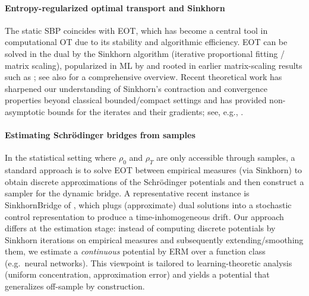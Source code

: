\documentclass[11pt]{article}
\theoremstyle{remark}
\numberwithin{equation}{section}
\begin{document}
\paragraph{Entropy-regularized optimal transport and Sinkhorn}
The static SBP coincides with EOT, which has become a
central tool in computational OT due to its stability and algorithmic efficiency.
EOT can be solved in the dual by the Sinkhorn algorithm (iterative proportional fitting / matrix scaling),
popularized in ML by \citet{Cuturi2013} and rooted in earlier matrix-scaling results such as
\citet{FranklinLorenz1989}; see also \citet{PeyreCuturi2019} for a comprehensive overview.
Recent theoretical work has sharpened our understanding of Sinkhorn’s contraction and convergence
properties beyond classical bounded/compact settings and has provided non-asymptotic bounds for
the iterates and their gradients; see, e.g., \citet{ConfortiDurmusGreco2023,GrecoNobleConfortiDurmus2023}.

\paragraph{Estimating Schr\"odinger bridges from samples}
In the statistical setting where $\rho_0$ and $\rho_T$ are only accessible through samples, a standard
approach is to solve EOT between empirical measures (via Sinkhorn) to obtain discrete approximations
of the Schr\"odinger potentials and then construct a sampler for the dynamic bridge.
A representative recent instance is SinkhornBridge of \citet{PooladianNilesWeed2024}, which plugs
(approximate) dual solutions into a stochastic control representation to produce a time-inhomogeneous
drift.
Our approach differs at the estimation stage: instead of computing discrete potentials by Sinkhorn
iterations on empirical measures and subsequently extending/smoothing them, we estimate a
\emph{continuous} potential by ERM over a function class (e.g.\ neural
networks). This viewpoint is tailored to learning-theoretic analysis (uniform concentration, approximation
error) and yields a potential that generalizes off-sample by construction.
\end{document}
